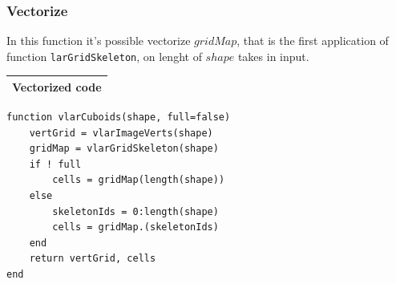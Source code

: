 \documentclass{article}
\begin{document}
\vspace{2ex}

\subsubsection{Vectorize}
In this function it's possible vectorize $gridMap$, that is the first application of function \texttt{larGridSkeleton}, on lenght of $shape$ takes in input.
\vspace{1ex}
\begin{flushleft} \small
\begin{center}
\begin{tabular}{|p{16cm}|}
\hline
\cellcolor[gray]{.9}Vectorized code\\
\hline
\end{tabular}
\end{center}
\vspace{2ex}
\begin{list}{}{} \item
   \begin{Verbatim}[tabsize=4]
function vlarCuboids(shape, full=false)
    vertGrid = vlarImageVerts(shape)
    gridMap = vlarGridSkeleton(shape)
    if ! full
        cells = gridMap(length(shape))
    else
        skeletonIds = 0:length(shape)
        cells = gridMap.(skeletonIds)
    end
    return vertGrid, cells
end
   \end{Verbatim}
\end{list}
\end{flushleft}
\vspace{2ex}
\end{document}
